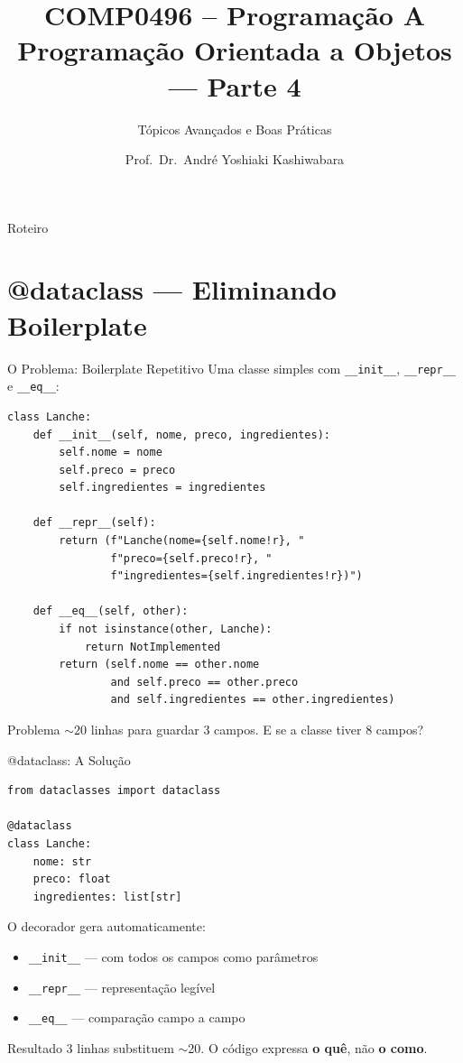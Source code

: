 \documentclass[aspectratio=169]{beamer}
\title{COMP0496 -- Programação A \\ Programação Orientada a Objetos --- Parte 4}
\subtitle{Tópicos Avançados e Boas Práticas}
\author{Prof.\ Dr.\ André Yoshiaki Kashiwabara}
\institute{DCOMP -- Universidade Federal de Sergipe\\\texttt{andreyoshiaki@dcomp.ufs.br}}
\date{}
\begin{document}
\begin{frame}
\titlepage
\end{frame}

\begin{frame}{Roteiro}
\tableofcontents
\end{frame}

\section{@dataclass --- Eliminando Boilerplate}

\begin{frame}{O Problema: Boilerplate Repetitivo}
Uma classe simples com \texttt{\_\_init\_\_}, \texttt{\_\_repr\_\_} e \texttt{\_\_eq\_\_}:

\begin{lstlisting}
class Lanche:
    def __init__(self, nome, preco, ingredientes):
        self.nome = nome
        self.preco = preco
        self.ingredientes = ingredientes

    def __repr__(self):
        return (f"Lanche(nome={self.nome!r}, "
                f"preco={self.preco!r}, "
                f"ingredientes={self.ingredientes!r})")

    def __eq__(self, other):
        if not isinstance(other, Lanche):
            return NotImplemented
        return (self.nome == other.nome
                and self.preco == other.preco
                and self.ingredientes == other.ingredientes)
\end{lstlisting}

\begin{alertblock}{Problema}
$\sim$20 linhas para guardar 3 campos. E se a classe tiver 8 campos?
\end{alertblock}
\end{frame}

\begin{frame}[fragile]{@dataclass: A Solução}
\begin{lstlisting}
from dataclasses import dataclass

@dataclass
class Lanche:
    nome: str
    preco: float
    ingredientes: list[str]
\end{lstlisting}

O decorador gera automaticamente:
\begin{itemize}
  \item \texttt{\_\_init\_\_} --- com todos os campos como parâmetros
  \item \texttt{\_\_repr\_\_} --- representação legível
  \item \texttt{\_\_eq\_\_} --- comparação campo a campo
\end{itemize}

\begin{exampleblock}{Resultado}
3 linhas substituem $\sim$20. O código expressa \textbf{o quê}, não \textbf{o como}.
\end{exampleblock}
\end{frame}
\end{document}
